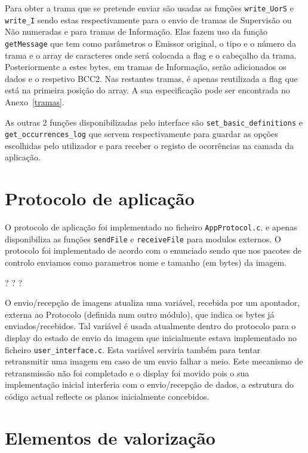 \documentclass[11pt,a4paper,reqno]{report}
\numberwithin{equation}{section}
\begin{document}
Para obter a trama que se pretende enviar são usadas as funções \verb|write_UorS| e \verb|write_I| sendo estas respectivamente para o envio de tramas de Supervisão ou Não numeradas e para tramas de Informação. Elas fazem uso da função \verb|getMessage| que tem como parâmetros o Emissor original, o tipo e o número da trama e o array de caracteres onde será colocada a flag e o cabeçalho da trama. Posteriormente a estes bytes, em tramas de Informação, serão adicionados os dados e o respetivo BCC2. Nas restantes tramas, é apenas reutilizada a flag que está na primeira posição do array. A sua especificação pode ser encontrada no Anexo~\ref{tramas}.

As outras 2 funções disponibilizadas pelo interface são \verb|set_basic_definitions| e \verb|get_occurrences_log| que servem respectivamente para guardar as opções escolhidas pelo utilizador e para receber o registo de ocorrências na camada da aplicação.


\chapter{Protocolo de aplicação}

O protocolo de aplicação foi implementado no ficheiro \verb|AppProtocol.c|. e apenas disponibiliza as funções \verb|sendFile| e \verb|receiveFile| para modulos externos. O protocolo foi implementado de acordo com o enunciado sendo que nos pacotes de controlo enviamos como parametros  nome e tamanho (em bytes) da imagem.

? ? ?

O envio/recepção de imagens atualiza uma variável, recebida por um apontador, externa ao Protocolo (definida num outro módulo), que indica os bytes já enviados/recebidos. Tal variável é usada atualmente dentro do protocolo para o display do estado de envio da imagem que inicialmente estava implementado no ficheiro \verb|user_interface.c|. Esta variável serviria também para tentar retransmitir uma imagem em caso de um envio falhar a meio. Este mecanismo de retransmissão não foi completado e o display foi movido pois o sua implementação inicial interferia com o envio/recepção de dados, a estrutura do código actual reflecte os planos inicialmente concebidos.

\chapter{Elementos de valorização}
\end{document}
